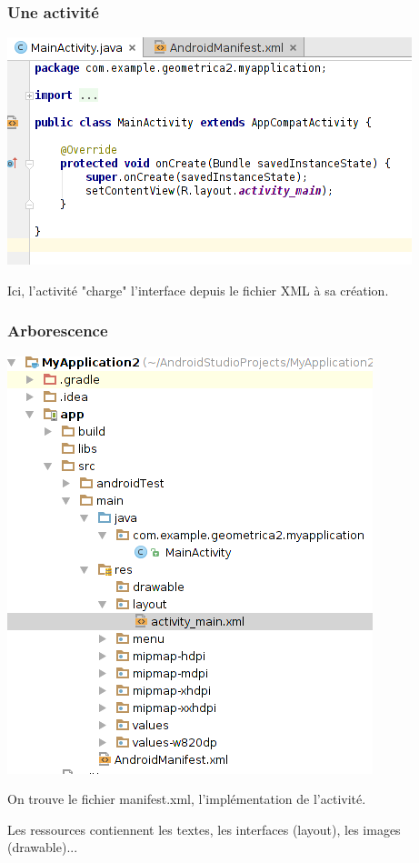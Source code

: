 \documentclass{beamer}
\begin{document}
\begin{frame}
\frametitle{Une activité}
\begin{center}
\includegraphics[scale=0.4]{mainact.png}
\end{center}

\begin{block}{}
Ici, l'activité "charge" l'interface depuis le fichier XML à sa création.
\end{block}

\end{frame}

\begin{frame}
\frametitle{Arborescence}
\begin{center}
\includegraphics[scale=0.3]{tree.png}
\end{center}
\begin{block}{}
On trouve le fichier manifest.xml, l'implémentation de l'activité.
\end{block}

\begin{block}{}
Les ressources contiennent les textes, les interfaces (layout), les images (drawable)...
\end{block}
\end{frame}
\end{document}
